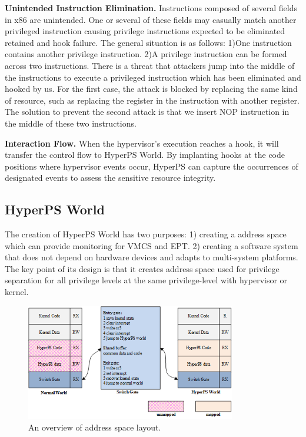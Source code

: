 \documentclass[10pt, numbers, preprint ]{sigplanconf}
\begin{document}
{\textbf{Unintended Instruction Elimination.} Instructions composed of several fields in x86 are unintended. One or several of these fields may casually match another privileged instruction causing privilege instructions expected to be eliminated retained and hook failure. The general situation is as follows: 1)One instruction contains another privilege instruction. 2)A privilege instruction can be formed across two instructions. There is a threat that attackers jump into the middle of the instructions to execute a privileged instruction which has been eliminated and hooked by us. For the first case, the attack is blocked by replacing the same kind of resource, such as replacing the register in the instruction with another register. The solution to prevent the second attack is that we insert NOP instruction in the middle of these two instructions.

\textbf{Interaction Flow.} When the hypervisor’s execution reaches a hook, it will transfer the control flow to HyperPS World. By implanting hooks at the code positions where hypervisor events occur, HyperPS can capture the occurrences of designated events to assess the sensitive resource integrity.

\subsection{HyperPS World} \label{subsec:hyperpswld}
The creation of HyperPS World has two purposes: 1) creating a address space which can provide monitoring for VMCS and EPT. 2)  creating a software system that does not depend on hardware devices and adapts to multi-system platforms. The key point of its design is that it creates address space used for privilege separation for all privilege levels at the same privilege-level with hypervisor or kernel.

\begin{figure}[htbp]
	\centerline{\includegraphics[height=2.00in]{figures/p4.png}}
	\caption{An overview of address space layout.}
	\label{fg4_addr_space}
\end{figure}

}
\end{document}
